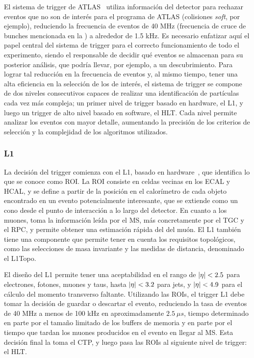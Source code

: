 El sistema de trigger de \ac{ATLAS}~\cite{ATLAS-Trigger-Performance-2010,ATLAS-Trigger-Performance-2015,ATLAS-Trigger-Performance-Run2} utiliza información del detector para rechazar eventos que no son de interés para el programa de \ac{ATLAS} (colisiones \textit{soft}, por ejemplo), reduciendo la frecuencia de eventos de 40 MHz (frecuencia de cruce de bunches mencionada en la \Sect{\ref{sec:atlas:LHC}}) a alrededor de 1.5 kHz. Es necesario enfatizar aquí el papel central del sistema de trigger para el correcto funcionamiento de todo el experimento, siendo el responsable de decidir qué eventos se almacenan para su posterior análisis, que podría llevar, por ejemplo, a un descubrimiento. Para lograr tal reducción en la frecuencia de eventos y, al mismo tiempo, tener una alta eficiencia en la selección de los de interés, el sistema de trigger se compone de dos niveles consecutivos capaces de realizar una identificación de partículas cada vez más compleja; un primer nivel de trigger basado en hardware, el \acf{L1}, y luego un trigger de alto nivel basado en software, el \acf{HLT}. Cada nivel permite analizar los eventos con mayor detalle, aumentando la precisión de los criterios de selección y la complejidad de los algoritmos utilizados.


\subsubsection{\acf{L1}}

La decisión del trigger comienza con el \ac{L1}, basado en hardware~\cite{ATLAS-L1Trigger}, que identifica lo que se conoce como \ac{ROI}. La \ac{ROI} consiste en celdas vecinas en los \ac{ECAL} y \ac{HCAL}, y se define a partir de la posición en el calorímetro de cada objeto encontrado en un evento potencialmente interesante, que se extiende como un cono desde el punto de interacción a lo largo del detector.
En cuanto a los muones, toma la información leída por el \ac{MS}, más concretamente por el \ac{TGC} y el \ac{RPC}, y permite obtener una estimación rápida del \pt del muón.
El \ac{L1} también tiene una componente que permite tener en cuenta los requisitos topológicos, como las selecciones de masa invariante y las medidas de distancia, denominado el \ac{L1Topo}.

El diseño del \ac{L1} permite tener una aceptabilidad en el rango de \(|\eta|<2.5\) para electrones, fotones, muones y taus, hasta \(|\eta|<3.2\) para jets, y \(|\eta|<4.9\) para el cálculo del momento transverso faltante.
Utilizando las \acp{ROI}, el trigger \ac{L1} debe tomar la decisión de guardar o descartar el evento, reduciendo la tasa de eventos de 40 MHz a menos de 100 kHz en aproximadamente \(2.5~\mu s\), tiempo determinado en parte por el tamaño limitado de los buffers de memoria y en parte por el tiempo que tardan los muones producidos en el evento en llegar al \ac{MS}. Esta decisión final la toma el \ac{CTP}, y luego pasa las \acp{ROI} al siguiente nivel de trigger: el \ac{HLT}.




